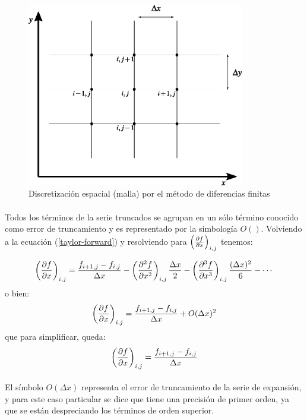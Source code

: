 \documentclass[letterpaper, openright, 12pt]{book}
\begin{document}
	\begin{figure}[htbp!]
		\centering
		\includegraphics[width=95mm]{./Imagenes/malla-DF1}
		\caption[Discretización por Diferencias Finitas]{Discretización espacial (malla) por el método de diferencias finitas \cite{anderson-yotros}}
		\label{malla-DF1}
	\end{figure}
	
	\paragraph*{}
	Todos los términos de la serie truncados se agrupan en un sólo término conocido como error de truncamiento y es representado por la simbología $O()$. Volviendo a la ecuación (\ref{taylor-forward}) y resolviendo para $\left( \pdv{f}{x} \right)_{i,j}$ tenemos:
	
	\begin{equation}
	\left( \pdv{f}{x} \right)_{i,j} = \frac{f_{i+1, j} - f_{i,j}}{\Delta x} - \left( \pdv[2]{f}{x} \right)_{i,j} \frac{\Delta x}{2} - \left( \pdv[3]{f}{x} \right)_{i,j} \frac{(\Delta x)^2}{6} - \dotsb
	\end{equation}
	o bien:
	\begin{equation*}
	\left( \pdv{f}{x} \right)_{i,j} = \frac{f_{i+1, j} - f_{i,j}}{\Delta x} + O(\Delta x)^2
	\end{equation*}
	que para simplificar, queda:\\
	\begin{equation}
	\left( \pdv{f}{x} \right)_{i,j} = \frac{f_{i+1, j} - f_{i,j}}{\Delta x}
	\label{forward-x1}
	\end{equation}
	
	\paragraph*{}
	El símbolo $O(\Delta x)$ representa el error de truncamiento de la serie de expansión, y para este caso particular se dice que tiene una precisión de primer orden, ya que se están despreciando los términos de orden superior.
	
\end{document}
